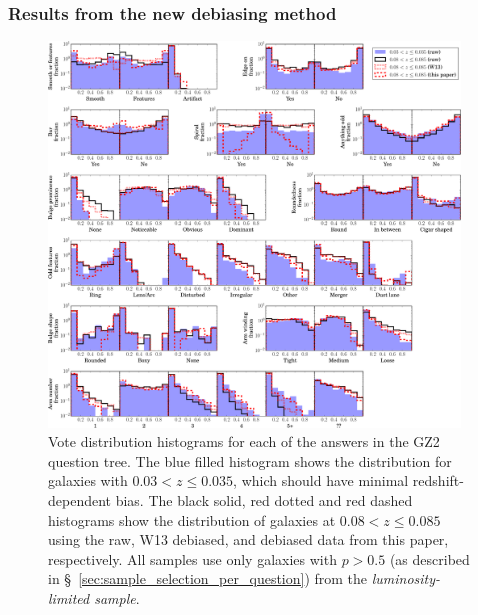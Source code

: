 \documentclass[useAMS,usenatbib]{mn2e}
\begin{document}
\subsubsection{Results from the new debiasing method}
\label{sec:debiasing_results}

\begin{figure}
		\centering

        \includegraphics[width=0.975\textwidth]{Images/Bias/Debiasing/all_histograms.pdf}

        \caption{Vote distribution histograms for each of the answers in the GZ2 question tree. The blue filled histogram shows the distribution for galaxies with $0.03< z \leq 0.035$, which should have minimal redshift-dependent bias. The black solid, red dotted and red dashed histograms show the distribution of galaxies at $0.08 < z \leq 0.085$ using the raw, W13 debiased, and debiased data from this paper, respectively. All samples use only galaxies with $p>0.5$ (as described in \S~\ref{sec:sample_selection_per_question}) from the \textit{luminosity-limited sample}.}

        \label{fig:all_histograms}

\end{figure}
\end{document}
